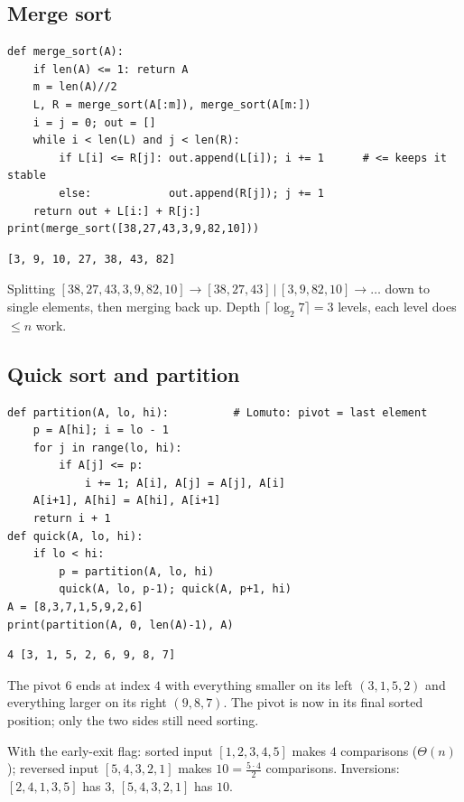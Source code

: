 \documentclass[11pt,a4paper]{article}
\begin{document}
\subsection{Merge sort}
\begin{lstlisting}
def merge_sort(A):
    if len(A) <= 1: return A
    m = len(A)//2
    L, R = merge_sort(A[:m]), merge_sort(A[m:])
    i = j = 0; out = []
    while i < len(L) and j < len(R):
        if L[i] <= R[j]: out.append(L[i]); i += 1      # <= keeps it stable
        else:            out.append(R[j]); j += 1
    return out + L[i:] + R[j:]
print(merge_sort([38,27,43,3,9,82,10]))
\end{lstlisting}
\begin{lstlisting}[style=out]
[3, 9, 10, 27, 38, 43, 82]
\end{lstlisting}
Splitting $[38,27,43,3,9,82,10]\to[38,27,43]\,|\,[3,9,82,10]\to\dots$ down to single elements, then merging back up. Depth $\lceil\log_2 7\rceil=3$ levels, each level does $\le n$ work.

\subsection{Quick sort and partition}
\begin{lstlisting}
def partition(A, lo, hi):          # Lomuto: pivot = last element
    p = A[hi]; i = lo - 1
    for j in range(lo, hi):
        if A[j] <= p:
            i += 1; A[i], A[j] = A[j], A[i]
    A[i+1], A[hi] = A[hi], A[i+1]
    return i + 1
def quick(A, lo, hi):
    if lo < hi:
        p = partition(A, lo, hi)
        quick(A, lo, p-1); quick(A, p+1, hi)
A = [8,3,7,1,5,9,2,6]
print(partition(A, 0, len(A)-1), A)
\end{lstlisting}
\begin{lstlisting}[style=out]
4 [3, 1, 5, 2, 6, 9, 8, 7]
\end{lstlisting}
The pivot $6$ ends at index $4$ with everything smaller on its left $(3,1,5,2)$ and everything larger on its right $(9,8,7)$. The pivot is now in its final sorted position; only the two sides still need sorting.

\begin{example}
With the early-exit flag: sorted input $[1,2,3,4,5]$ makes $4$ comparisons ($\Theta(n)$); reversed input $[5,4,3,2,1]$ makes $10=\frac{5\cdot4}{2}$ comparisons. Inversions: $[2,4,1,3,5]$ has $3$, $[5,4,3,2,1]$ has $10$.
\end{example}
\end{document}
